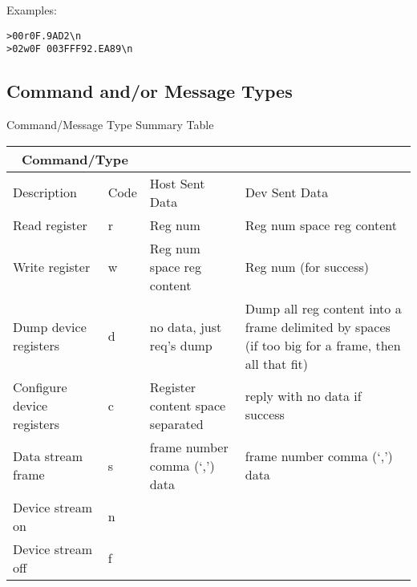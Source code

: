 \documentclass{customdocclass}
\begin{document}
Examples:

\begin{lstlisting}
>00r0F.9AD2\n
>02w0F 003FFF92.EA89\n
\end{lstlisting}

\subsection{Command and/or Message Types}

\begin{center}
\small
Command/Message Type Summary Table
\begin{tabularx}{\textwidth}{|X|l|X|X|} \hline
\multicolumn{2}{|c|}{Command/Type} & & \\ \hline
Description & Code & Host Sent Data & Dev Sent Data \\ \hline
Read register & r & Reg num & Reg num space reg content \\ \hline
Write register & w & Reg num space reg content & Reg num (for success) \\ \hline
Dump device registers & d & no data, just req's dump & Dump all reg content into a frame delimited by spaces (if too big for a frame, then all that fit) \\ \hline
Configure device registers & c & Register content space separated & reply with no data if success \\ \hline
Data stream frame & s & frame number comma (`,') data &  frame number comma (`,') data \\ \hline
Device stream on & n & & \\ \hline
Device stream off & f & & \\ \hline
\end{tabularx}
\end{center}
\end{document}
